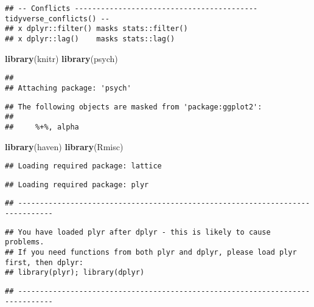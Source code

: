 \documentclass[]{article}
\newenvironment{Shaded}{\begin{snugshade}}{\end{snugshade}}
\newcommand{\KeywordTok}[1]{\textcolor[rgb]{0.13,0.29,0.53}{\textbf{#1}}}
\newcommand{\NormalTok}[1]{#1}
\begin{document}
\begin{verbatim}
## -- Conflicts ------------------------------------------ tidyverse_conflicts() --
## x dplyr::filter() masks stats::filter()
## x dplyr::lag()    masks stats::lag()
\end{verbatim}

\begin{Shaded}
\begin{Highlighting}[]
\KeywordTok{library}\NormalTok{(knitr)}
\KeywordTok{library}\NormalTok{(psych)}
\end{Highlighting}
\end{Shaded}

\begin{verbatim}
## 
## Attaching package: 'psych'
\end{verbatim}

\begin{verbatim}
## The following objects are masked from 'package:ggplot2':
## 
##     %+%, alpha
\end{verbatim}

\begin{Shaded}
\begin{Highlighting}[]
\KeywordTok{library}\NormalTok{(haven)}
\KeywordTok{library}\NormalTok{(Rmisc)}
\end{Highlighting}
\end{Shaded}

\begin{verbatim}
## Loading required package: lattice
\end{verbatim}

\begin{verbatim}
## Loading required package: plyr
\end{verbatim}

\begin{verbatim}
## ------------------------------------------------------------------------------
\end{verbatim}

\begin{verbatim}
## You have loaded plyr after dplyr - this is likely to cause problems.
## If you need functions from both plyr and dplyr, please load plyr first, then dplyr:
## library(plyr); library(dplyr)
\end{verbatim}

\begin{verbatim}
## ------------------------------------------------------------------------------
\end{verbatim}
\end{document}
